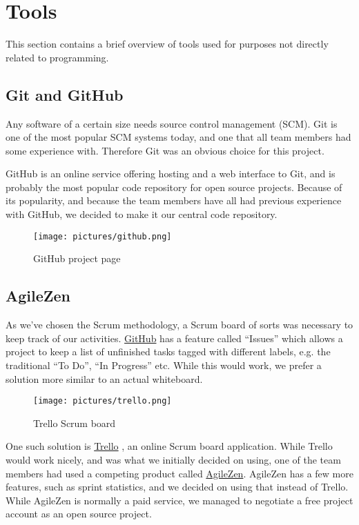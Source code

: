 \section{Tools}

    This section contains a brief overview of tools used for purposes not
    directly related to programming.

\subsection{Git and GitHub}
\label{subsec:git}
    Any software of a certain size needs source control management (SCM). Git is
    one of the most popular SCM systems today, and one that all team members had
    some experience with. Therefore Git was an obvious choice for this project.

    GitHub \cite{github, githubPage} is an online service offering hosting and a web interface to Git, and is
    probably the most popular code repository for open source projects. Because of
    its popularity, and because the team members have all had previous experience
    with GitHub, we decided to make it our central code repository.

\begin{figure}[htb]
  \centering
  \texttt{[image: pictures/github.png]}
  \caption{GitHub project page}
\end{figure}

\subsection{AgileZen}
    As we've chosen the Scrum methodology, a Scrum board of sorts was necessary to
    keep track of our activities. \href{https://github.com}{GitHub} has a
    feature called ``Issues'' which allows a project to keep a list of unfinished
    tasks tagged with different labels, e.g. the traditional ``To Do'', ``In
    Progress'' etc. While this would work, we prefer a solution more similar to an
    actual whiteboard. \cite{agileZen}

    \begin{figure}[htb]
      \centering
      \texttt{[image: pictures/trello.png]}
      \caption{Trello Scrum board}
    \end{figure}

    One such solution is \href{https://trello.com}{Trello} \cite{trello, trelloPage}, an online Scrum
    board application. While Trello would work nicely, and was what we initially
    decided on using, one of the team members had used a competing product called
    \href{http://www.agilezen.com/}{AgileZen}. AgileZen has a few more features,
    such as sprint statistics, and we decided on using that instead of Trello.
    While AgileZen is normally a paid service, we managed to negotiate a free
    project account as an open source project.

